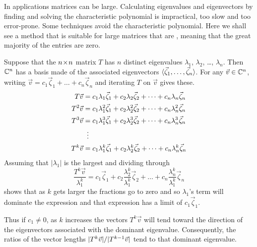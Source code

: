 In applications matrices can be large.
Calculating eigenvalues and eigenvectors by
finding and solving the characteristic polynomial is impractical, too slow
and too error-prone.
Some techniques avoid the characteristic polynomial. 
Here we shall see a method that is suitable for large matrices that are
, 
meaning that the great majority of the entries are zero.

Suppose that the $n \! \times \! n$ matrix $T$ has $n$ distinct eigenvalues
$\lambda_1$, $\lambda_2$, \ldots, $\lambda_n$.
Then $\mathbb{C}^n$ has a basis made of the associated eigenvectors
$\langle\vec{\zeta}_1,\dots,\vec{\zeta}_n\rangle$.
For any $\vec{v}\in\mathbb{C}^n$, writing
$\vec{v}=c_1\vec{\zeta}_1+\dots+c_n\vec{\zeta}_n$ and iterating $T$ on $\vec{v}$
gives these.
\begin{align*}
  T\vec{v} 
      &=c_1\lambda_1\vec{\zeta}_1+c_2\lambda_2\vec{\zeta}_2+
                              \dots+c_n\lambda_n\vec{\zeta}_n  \\
  T^2\vec{v} 
      &=c_1\lambda_1^2\vec{\zeta}_1+c_2\lambda_2^2\vec{\zeta}_2+
                              \dots+c_n\lambda_n^2\vec{\zeta}_n  \\
  T^3\vec{v} 
      &=c_1\lambda_1^3\vec{\zeta}_1+c_2\lambda_2^3\vec{\zeta}_2+
                              \dots+c_n\lambda_n^3\vec{\zeta}_n  \\
      &\vdotswithin{=}                                            \\
  T^k\vec{v} 
      &=c_1\lambda_1^k\vec{\zeta}_1+c_2\lambda_2^k\vec{\zeta}_2+
                              \dots+c_n\lambda_n^k\vec{\zeta}_n  
\end{align*}
Assuming that $|\lambda_1|$
is the largest and dividing through
\begin{equation*}
  \frac{T^k\vec{v}}{\lambda_1^k} 
      =c_1\vec{\zeta}_1+c_2\frac{\lambda_2^k}{\lambda_1^k}\vec{\zeta}_2+
                    \dots+c_n\frac{\lambda_n^k}{\lambda_1^k}\vec{\zeta}_n  
\end{equation*} 
shows that as $k$ gets larger the fractions go to zero
and so $\lambda_1$'s term will dominate the expression and
that expression has a limit of $c_1\vec{\zeta}_1$.

Thus if $c_1\neq 0$, 
as $k$ increases the vectors $T^k\vec{v}$ will tend toward the direction of 
the eigenvectors associated with the dominant eigenvalue.
Consequently,
the ratios  of the vector lengths $\lvert T^{k}\vec{v}\rvert/\lvert T^{k-1}\vec{v}\rvert$ 
tend to that dominant eigenvalue.

